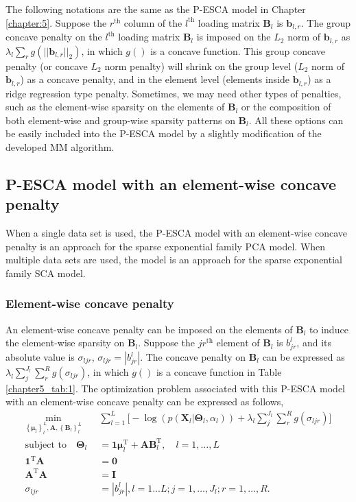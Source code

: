 The following notations are the same as the P-ESCA model in Chapter \ref{chapter:5}. Suppose the $r^{\text{th}}$ column of the $l^{\text{th}}$ loading matrix $\mathbf{B}_l$ is $\mathbf{b}_{l,r}$. The group concave penalty on the $l^{\text{th}}$ loading matrix $\mathbf{B}_l$ is imposed on the $L_2$ norm of $\mathbf{b}_{l,r}$ as $\lambda_l \sum_{r} g(||\mathbf{b}_{l,r}||_2)$, in which $g()$ is a concave function. This group concave penalty (or concave $L_2$ norm penalty) will shrink on the group level ($L_2$ norm of $\mathbf{b}_{l,r}$) as a concave penalty, and in the element level (elements inside $\mathbf{b}_{l,r}$) as a ridge regression type penalty. Sometimes, we may need other types of penalties, such as the element-wise sparsity on the elements of $\mathbf{B}_l$ or the composition of both element-wise and group-wise sparsity patterns on $\mathbf{B}_l$. All these options can be easily included into the P-ESCA model by a slightly modification of the developed MM algorithm.

\subsection{P-ESCA model with an element-wise concave penalty}
When a single data set is used, the P-ESCA model with an element-wise concave penalty is an approach for the sparse exponential family PCA model. When multiple data sets are used, the model is an approach for the sparse exponential family SCA model.

\subsubsection{Element-wise concave penalty}
An element-wise concave penalty can be imposed on the elements of $\mathbf{B}_l$ to induce the element-wise sparsity on $\mathbf{B}_l$. Suppose the $jr^{\text{th}}$ element of $\mathbf{B}_l$ is $b_{jr}^{l}$, and its absolute value is $\sigma_{ljr}$, $\sigma_{ljr} = |b_{jr}^{l}|$. The concave penalty on $\mathbf{B}_l$ can be expressed as $\lambda_l \sum_{j}^{J_l}\sum_{r}^{R} g(\sigma_{ljr})$, in which $g()$ is a concave function in Table \ref{chapter5_tab:1}. The optimization problem associated with this P-ESCA model with an element-wise concave penalty can be expressed as follows,
\begin{equation}\label{chapter6_eq:1}
\begin{aligned}
    \min_{ \left\{\bm{\mu}_l\right\}_{l}^{L}, \mathbf{A}, \left\{\mathbf{B}_l\right\}_{l}^{L}} \quad & \sum_{l=1}^{L} \Big[ -\log(p(\mathbf{X}_l|\mathbf{\Theta}_l, \alpha_l)) + \lambda_l \sum_{j}^{J_l}\sum_{r}^{R} g(\sigma_{ljr}) \Big] \\
    \text{subject to} \quad \mathbf{\Theta}_l &= \mathbf{1}\bm{\mu}_l^{\text{T}} + \mathbf{AB}_l^{\text{T}}, \quad l = 1,\ldots,L \\
     \mathbf{1}^{\text{T}}\mathbf{A} &= \mathbf{0}\\
	 \mathbf{A}^{\text{T}}\mathbf{A} &= \mathbf{I} \\
	 \sigma_{ljr} &= |b_{jr}^{l}|, l = 1...L; j=1,\dots,J_l; r = 1,\ldots, R.
\end{aligned}
\end{equation}

